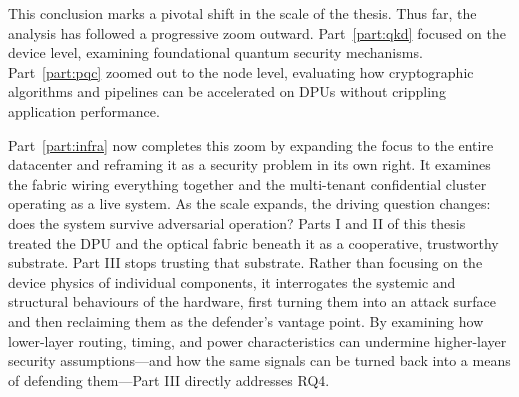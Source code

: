 This conclusion marks a pivotal shift in the scale of the thesis. Thus far, the analysis has followed a progressive zoom outward. Part~\ref{part:qkd} focused on the device level, examining foundational quantum security mechanisms. Part~\ref{part:pqc} zoomed out to the node level, evaluating how cryptographic algorithms and pipelines can be accelerated on DPUs without crippling application performance. 

Part~\ref{part:infra} now completes this zoom by expanding the focus to the entire datacenter and reframing it as a security problem in its own right. It examines the fabric wiring everything together and the multi-tenant confidential cluster operating as a live system. As the scale expands, the driving question changes: does the system survive adversarial operation? Parts I and II of this thesis treated the DPU and the optical fabric beneath it as a cooperative, trustworthy substrate. Part III stops trusting that substrate. Rather than focusing on the device physics of individual components, it interrogates the systemic and structural behaviours of the hardware, first turning them into an attack surface and then reclaiming them as the defender's vantage point. By examining how lower-layer routing, timing, and power characteristics can undermine higher-layer security assumptions---and how the same signals can be turned back into a means of defending them---Part III directly addresses RQ4.

\renewcommand{\bottomfraction}{0.3}
\renewcommand{\textfraction}{0.2}
